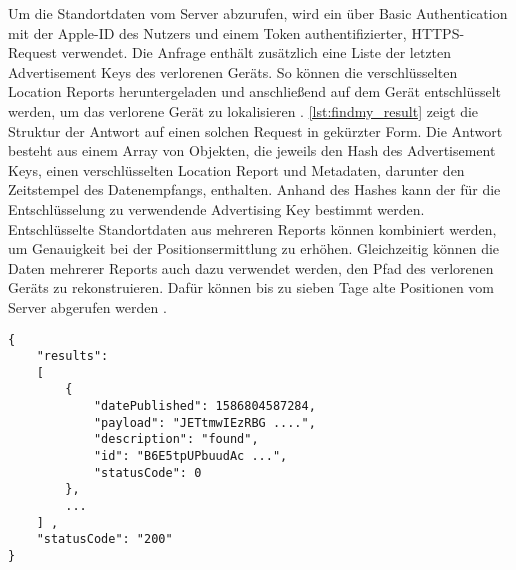 Um die Standortdaten vom Server abzurufen, wird ein über Basic Authentication mit der Apple-ID des Nutzers und einem Token authentifizierter, HTTPS-Request verwendet.
Die Anfrage enthält zusätzlich eine Liste der letzten Advertisement Keys des verlorenen Geräts.
So können die verschlüsselten Location Reports heruntergeladen und anschließend auf dem Gerät entschlüsselt werden, um das verlorene Gerät zu lokalisieren \cite{Heinrich_FindMy}.
\autoref{lst:findmy_result} zeigt die Struktur der Antwort auf einen solchen Request in gekürzter Form.
Die Antwort besteht aus einem Array von Objekten, die jeweils den Hash des Advertisement Keys, einen verschlüsselten Location Report und Metadaten, darunter den Zeitstempel des Datenempfangs, enthalten.
Anhand des Hashes kann der für die Entschlüsselung zu verwendende Advertising Key bestimmt werden.
Entschlüsselte Standortdaten aus mehreren Reports können kombiniert werden, um Genauigkeit bei der Positionsermittlung zu erhöhen.
Gleichzeitig können die Daten mehrerer Reports auch dazu verwendet werden, den Pfad des verlorenen Geräts zu rekonstruieren.
Dafür können bis zu sieben Tage alte Positionen vom Server abgerufen werden \cite{Heinrich_FindMy}.

\begin{lstlisting}[label=lst:findmy_result,caption={Beispielhafte Antwort beim herunterladen von Location Reports\cite{Heinrich_FindMy}.}]
{
    "results": 
    [
        {
            "datePublished": 1586804587284,
            "payload": "JETtmwIEzRBG ....",
            "description": "found",
            "id": "B6E5tpUPbuudAc ...",
            "statusCode": 0
        },
        ...
    ] ,
    "statusCode": "200"
}
\end{lstlisting}